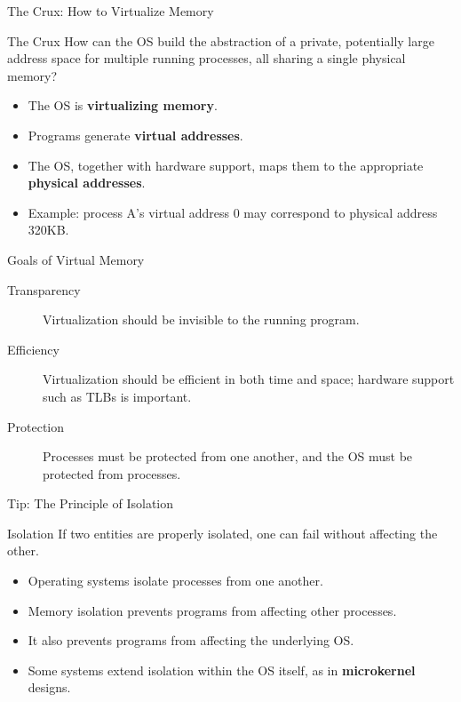 \begin{frame}{The Crux: How to Virtualize Memory}
    \begin{block}{The Crux}
        How can the OS build the abstraction of a private,
        potentially large address space for multiple running processes,
        all sharing a single physical memory?
    \end{block}

    \begin{itemize}
        \item The OS is \textbf{virtualizing memory}.
        \item Programs generate \textbf{virtual addresses}.
        \item The OS, together with hardware support, maps them to
              the appropriate \textbf{physical addresses}.
        \item Example: process A's virtual address 0 may correspond
              to physical address 320KB.
    \end{itemize}

\end{frame}


\begin{frame}{Goals of Virtual Memory}
    \begin{description}
        \item[Transparency]
        Virtualization should be invisible to the running program.

        \item[Efficiency]
        Virtualization should be efficient in both time and space;
        hardware support such as TLBs is important.

        \item[Protection]
        Processes must be protected from one another, and the OS
        must be protected from processes.
    \end{description}
\end{frame}


\begin{frame}{Tip: The Principle of Isolation}
    \begin{block}{Isolation}
        If two entities are properly isolated, one can fail without
        affecting the other.
    \end{block}

    \begin{itemize}
        \item Operating systems isolate processes from one another.
        \item Memory isolation prevents programs from affecting
              other processes.
        \item It also prevents programs from affecting the
              underlying OS.
        \item Some systems extend isolation within the OS itself,
              as in \textbf{microkernel} designs.
    \end{itemize}
\end{frame}


